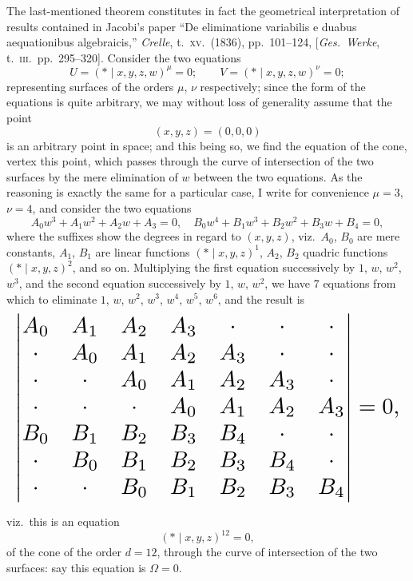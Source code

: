 \documentclass[11pt]{article}
\begin{document}
\medskip
The last-mentioned theorem constitutes in fact the geometrical interpretation of results contained in Jacobi's paper ``De eliminatione variabilis e duabus aequationibus algebraicis,'' \textit{Crelle}, t.\ \textsc{xv}.\ (1836), pp.\ 101--124, [\textit{Ges.\ Werke}, t.\ \textsc{iii}.\ pp.\ 295--320].  Consider the two equations
\[
U = (*\!\mid\! x, y, z, w)^{\mu} = 0;\qquad V = (*\!\mid\! x, y, z, w)^{\nu} = 0;
\]
representing surfaces of the orders $\mu$, $\nu$ respectively; since the form of the equations is quite arbitrary, we may without loss of generality assume that the point
\[
(x, y, z) = (0, 0, 0)
\]
is an arbitrary point in space; and this being so, we find the equation of the cone, vertex this point, which passes through the curve of intersection of the two surfaces by the mere elimination of $w$ between the two equations.  As the reasoning is exactly the same for a particular case, I write for convenience $\mu=3$, $\nu=4$, and consider the two equations
\[
A_{0}w^{3} + A_{1}w^{2} + A_{2}w + A_{3} = 0,\quad B_{0}w^{4} + B_{1}w^{3} + B_{2}w^{2} + B_{3}w + B_{4} = 0,
\]
where the suffixes show the degrees in regard to $(x, y, z)$, viz.\ $A_{0}$, $B_{0}$ are mere constants, $A_{1}$, $B_{1}$ are linear functions $(*\!\mid\! x, y, z)^{1}$, $A_{2}$, $B_{2}$ quadric functions $(*\!\mid\! x, y, z)^{2}$, and so on.  Multiplying the first equation successively by $1$, $w$, $w^{2}$, $w^{3}$, and the second equation successively by $1$, $w$, $w^{2}$, we have 7 equations from which to eliminate $1$, $w$, $w^{2}$, $w^{3}$, $w^{4}$, $w^{5}$, $w^{6}$, and the result is
\[
\resizebox{\textwidth}{!}{$\displaystyle
\begin{vmatrix}
A_{0} & A_{1} & A_{2} & A_{3} & \cdot & \cdot & \cdot \\
\cdot & A_{0} & A_{1} & A_{2} & A_{3} & \cdot & \cdot \\
\cdot & \cdot & A_{0} & A_{1} & A_{2} & A_{3} & \cdot \\
\cdot & \cdot & \cdot & A_{0} & A_{1} & A_{2} & A_{3} \\
B_{0} & B_{1} & B_{2} & B_{3} & B_{4} & \cdot & \cdot \\
\cdot & B_{0} & B_{1} & B_{2} & B_{3} & B_{4} & \cdot \\
\cdot & \cdot & B_{0} & B_{1} & B_{2} & B_{3} & B_{4}
\end{vmatrix} = 0,
$}
\]

viz.\ this is an equation
\[
(*\!\mid\! x, y, z)^{12} = 0,
\]
of the cone of the order $d = 12$, through the curve of intersection of the two surfaces: say this equation is $\Omega = 0$.
\end{document}
